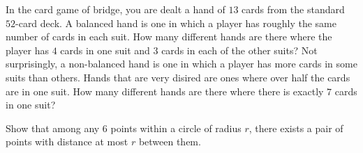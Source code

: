 \documentclass[12pt,twoside]{article}
\begin{document}
\begin{problem}{10}
In the card game of bridge, you are dealt a hand of $13$ cards from the standard $52$-card deck.
\bparts
{}
A balanced hand is one in which a player has roughly the same number of cards in each suit. How many different hands are there where the player has $4$ cards in one suit and $3$ cards in each of the other suits?
Not surprisingly, a non-balanced hand is one in which a player has more cards in some suits than others. Hands that are very disired are ones where over half the cards are in one suit. How many different hands are there where there is exactly $7$ cards in one suit?
\eparts
\end{problem}

\begin{problem}{10}
Show that among any $6$ points within a circle of radius $r$, there exists a pair of points with distance at most $r$ between them.
\end{problem}
\end{document}
